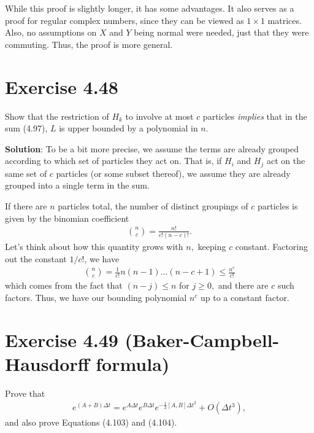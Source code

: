 \documentclass{book}
\begin{document}
    While this proof is slightly longer, it has some advantages. It also serves as a proof for regular complex numbers, since they can be viewed as $1\times 1$ matrices. Also, no assumptions on $X$ and $Y$ being normal were needed, just that they were commuting. Thus, the proof is more general.
    
    

\section*{Exercise 4.48}
    Show that the restriction of $H_k$ to involve at most $c$ particles \emph{implies} that in the sum (4.97), $L$ is upper bounded by a polynomial in $n$.

    \textbf{Solution}: To be a bit more precise, we assume the terms are already grouped according to which set of particles they act on. That is, if $H_i$ and $H_j$ act on the same set of $c$ particles (or some subset thereof), we assume they are already grouped into a single term in the sum. 
    
    If there are $n$ particles total, the number of distinct groupings of $c$ particles is given by the binomian coefficient
    \begin{align}
        \binom{n}{c} = \frac{n!}{c! (n-c)!}.
    \end{align}
    Let's think about how this quantity grows with $n,$ keeping $c$ constant. Factoring out the constant $1/c!$, we have
    \begin{align}
        \binom{n}{c} = \frac{1}{c!} n(n-1)\dots(n-c+1) \leq \frac{n^c}{c!}
    \end{align}
    which comes from the fact that $(n-j) \leq n$ for $j \geq 0,$ and there are $c$ such factors. Thus, we have our bounding polynomial $n^c$ up to a constant factor.
\section*{Exercise 4.49 (Baker-Campbell-Hausdorff formula)}
    Prove that 
    \begin{align}
        e^{(A+B)\Delta t} = e^{A\Delta t}e^{B\Delta t}e^{-\frac{1}{2}[A,B]\Delta t^2} + O(\Delta t^3),
    \end{align}
    and also prove Equations (4.103) and (4.104).
\end{document}
